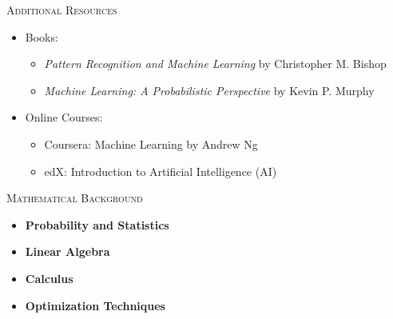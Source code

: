 \documentclass[compress]{beamer}
\begin{document}
\begin{frame}{\textsc{Additional Resources}}
  \begin{itemize}
    \item Books:
    \begin{itemize}
      \item \emph{Pattern Recognition and Machine Learning} by Christopher M. Bishop
      \item \emph{Machine Learning: A Probabilistic Perspective} by Kevin P. Murphy
    \end{itemize}
    \item Online Courses:
    \begin{itemize}
      \item Coursera: Machine Learning by Andrew Ng
      \item edX: Introduction to Artificial Intelligence (AI)
    \end{itemize}
  \end{itemize}
\end{frame}

\begin{frame}{\textsc{Mathematical Background}}
  \begin{itemize}
    \item \textbf{Probability and Statistics}
    \item \textbf{Linear Algebra}
    \item \textbf{Calculus}
    \item \textbf{Optimization Techniques}
  \end{itemize}
\end{frame}

\end{document}
